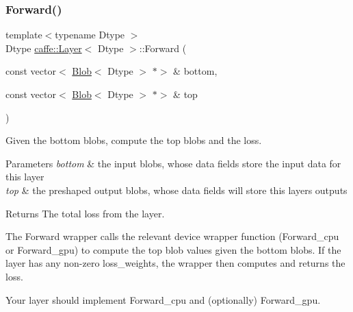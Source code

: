 \subsubsection{\texorpdfstring{Forward()}{Forward()}\hspace{0.1cm}{\footnotesize\ttfamily [2/2]}}
{\footnotesize\ttfamily template$<$typename Dtype $>$ \\
Dtype \mbox{\hyperlink{classcaffe_1_1_layer}{caffe\+::\+Layer}}$<$ Dtype $>$\+::Forward (\begin{DoxyParamCaption}\item[{const vector$<$ \mbox{\hyperlink{classcaffe_1_1_blob}{Blob}}$<$ Dtype $>$ $\ast$$>$ \&}]{bottom,  }\item[{const vector$<$ \mbox{\hyperlink{classcaffe_1_1_blob}{Blob}}$<$ Dtype $>$ $\ast$$>$ \&}]{top }\end{DoxyParamCaption})\hspace{0.3cm}{\ttfamily [inline]}}



Given the bottom blobs, compute the top blobs and the loss. 


\begin{DoxyParams}{Parameters}
{\em bottom} & the input blobs, whose data fields store the input data for this layer \\
\hline
{\em top} & the preshaped output blobs, whose data fields will store this layers\textquotesingle{} outputs \\
\hline
\end{DoxyParams}
\begin{DoxyReturn}{Returns}
The total loss from the layer.
\end{DoxyReturn}
The Forward wrapper calls the relevant device wrapper function (Forward\+\_\+cpu or Forward\+\_\+gpu) to compute the top blob values given the bottom blobs. If the layer has any non-\/zero loss\+\_\+weights, the wrapper then computes and returns the loss.

Your layer should implement Forward\+\_\+cpu and (optionally) Forward\+\_\+gpu. \mbox{\label{classcaffe_1_1_layer_a481323a3e0972c682787f2137468c29f}} 
